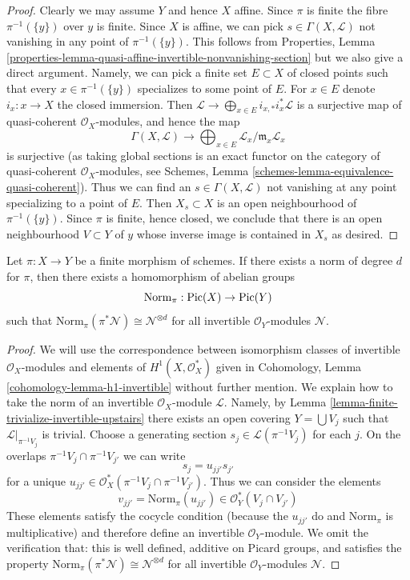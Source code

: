 \begin{proof}
Clearly we may assume $Y$ and hence $X$ affine. Since $\pi$ is finite the
fibre $\pi^{-1}(\{y\})$ over $y$ is finite.
Since $X$ is affine, we can pick $s \in \Gamma(X, \mathcal{L})$
not vanishing in any point of $\pi^{-1}(\{y\})$. This follows
from Properties, Lemma
\ref{properties-lemma-quasi-affine-invertible-nonvanishing-section}
but we also give a direct argument. Namely, we can
pick a finite set $E \subset X$ of closed points such that
every $x \in \pi^{-1}(\{y\})$ specializes to some point of $E$.
For $x \in E$ denote $i_x : x \to X$ the closed immersion.
Then
$\mathcal{L} \to \bigoplus_{x \in E} i_{x, *}i_x^*\mathcal{L}$
is a surjective map of quasi-coherent $\mathcal{O}_X$-modules,
and hence the map
$$
\Gamma(X, \mathcal{L}) \to
\bigoplus\nolimits_{x \in E} \mathcal{L}_x/\mathfrak m_x\mathcal{L}_x
$$
is surjective (as taking global sections is an exact functor on the
category of quasi-coherent $\mathcal{O}_X$-modules, see
Schemes, Lemma \ref{schemes-lemma-equivalence-quasi-coherent}).
Thus we can find an $s \in \Gamma(X, \mathcal{L})$
not vanishing at any point specializing to a point of $E$.
Then $X_s \subset X$ is an open neighbourhood of $\pi^{-1}(\{y\})$.
Since $\pi$ is finite, hence closed, we conclude that there is an
open neighbourhood $V \subset Y$ of $y$ whose inverse image
is contained in $X_s$ as desired.
\end{proof}

\begin{lemma}
\label{lemma-norm-invertible}
Let $\pi : X \to Y$ be a finite morphism of schemes. If there exists
a norm of degree $d$ for $\pi$, then there exists a homomorphism of
abelian groups
$$
\text{Norm}_\pi : \mathop{\mathrm{Pic}}\nolimits(X) \to \mathop{\mathrm{Pic}}\nolimits(Y)
$$
such that $\text{Norm}_\pi(\pi^*\mathcal{N}) \cong \mathcal{N}^{\otimes d}$
for all invertible $\mathcal{O}_Y$-modules $\mathcal{N}$.
\end{lemma}

\begin{proof}
We will use the correspondence between isomorphism classes of
invertible $\mathcal{O}_X$-modules and elements of
$H^1(X, \mathcal{O}_X^*)$ given in
Cohomology, Lemma \ref{cohomology-lemma-h1-invertible}
without further mention. We explain how to take the norm of an invertible
$\mathcal{O}_X$-module $\mathcal{L}$. Namely, by
Lemma \ref{lemma-finite-trivialize-invertible-upstairs}
there exists an open covering $Y = \bigcup V_j$ such that
$\mathcal{L}|_{\pi^{-1}V_j}$ is trivial. Choose a generating section
$s_j \in \mathcal{L}(\pi^{-1}V_j)$ for each $j$.
On the overlaps $\pi^{-1}V_j \cap \pi^{-1}V_{j'}$ we can write
$$
s_j = u_{jj'} s_{j'}
$$
for a unique $u_{jj'} \in \mathcal{O}^*_X(\pi^{-1}V_j \cap \pi^{-1}V_{j'})$.
Thus we can consider the elements
$$
v_{jj'} = \text{Norm}_\pi(u_{jj'}) \in \mathcal{O}_Y^*(V_j \cap V_{j'})
$$
These elements satisfy the cocycle condition (because the
$u_{jj'}$ do and $\text{Norm}_\pi$ is multiplicative) and
therefore define an invertible $\mathcal{O}_Y$-module.
We omit the verification that: this is well defined,
additive on Picard groups, and satisfies the property
$\text{Norm}_\pi(\pi^*\mathcal{N}) \cong \mathcal{N}^{\otimes d}$
for all invertible $\mathcal{O}_Y$-modules $\mathcal{N}$.
\end{proof}

